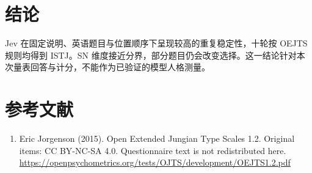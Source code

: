 \documentclass[10pt,a4paper,fontset=fandol]{ctexart}
\begin{document}
\section{结论}
Jev 在固定说明、英语题目与位置顺序下呈现较高的重复稳定性，十轮按 OEJTS 规则均得到 ISTJ。SN 维度接近分界，部分题目仍会改变选择。这一结论针对本次量表回答与计分，不能作为已验证的模型人格测量。
\section*{参考文献}
\begin{enumerate}
\item Eric Jorgenson (2015). Open Extended Jungian Type Scales 1.2. Original items: CC BY-NC-SA 4.0. Questionnaire text is not redistributed here. \url{https://openpsychometrics.org/tests/OJTS/development/OEJTS1.2.pdf}
\end{enumerate}
\end{document}
